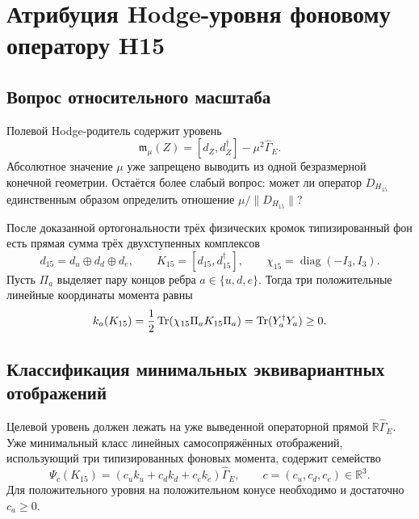 \chapter{Атрибуция Hodge-уровня фоновому оператору H15}
\label{ch:v7-hodge-level-background-attribution-gate}

\section{Вопрос относительного масштаба}

Полевой Hodge-родитель содержит уровень
\begin{equation}
 \mathfrak m_\mu(Z)
 =[d_Z,d_Z^\dagger]-\mu^2\widehat\Gamma_E.
 \label{eq:v7-background-level-moment}
\end{equation}
Абсолютное значение $\mu$ уже запрещено выводить из одной безразмерной
конечной геометрии. Остаётся более слабый вопрос: может ли оператор
$D_{H_{15}}$ единственным образом определить отношение
$\mu/\|D_{H_{15}}\|$?

После доказанной ортогональности трёх физических кромок типизированный фон
есть прямая сумма трёх двухступенных комплексов
\begin{equation}
 d_{15}=d_u\oplus d_d\oplus d_e,
 \qquad
 K_{15}=[d_{15},d_{15}^\dagger],
 \qquad
 \chi_{15}=\operatorname{diag}(-I_3,I_3).
 \label{eq:v7-background-level-typed-complex}
\end{equation}
Пусть $\Pi_a$ выделяет пару концов ребра $a\in\{u,d,e\}$. Тогда три
положительные линейные координаты момента равны
\begin{equation}
 k_a(K_{15})
 =\frac12\operatorname{Tr}\!\left(\chi_{15}\Pi_aK_{15}\Pi_a\right)
 =\operatorname{Tr}(Y_a^\dagger Y_a)\ge0.
 \label{eq:v7-background-level-edge-energies}
\end{equation}

\section{Классификация минимальных эквивариантных отображений}

Целевой уровень должен лежать на уже выведенной операторной прямой
$\mathbb R\widehat\Gamma_E$. Уже минимальный класс линейных
самосопряжённых отображений, использующий три типизированных фоновых момента,
содержит семейство
\begin{equation}
 \Psi_c(K_{15})
 =\left(c_uk_u+c_dk_d+c_ek_e\right)\widehat\Gamma_E,
 \qquad c=(c_u,c_d,c_e)\in\mathbb R^3.
 \label{eq:v7-background-level-map-family}
\end{equation}
Для положительного уровня на положительном конусе необходимо и достаточно
$c_a\ge0$.

